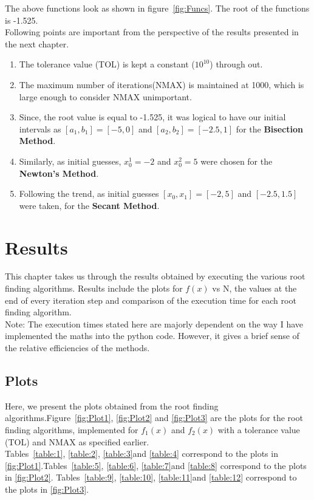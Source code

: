 \documentclass[a4paper, 12pt]{report}
\begin{document}
The above functions look as shown in figure~\ref{fig:Funcs}. The root of the functions is -1.525.\\
Following points are important from the perspective of the results presented in the next chapter.
\begin{enumerate}
    \item The tolerance value (TOL) is kept a constant ($10^{10}$) through out.
    \item The maximum number of iterations(NMAX) is maintained at 1000, which is large enough to consider NMAX unimportant.
    \item Since, the root value is equal to -1.525, it was logical to have our initial intervals as $[a_{1},b_{1}] = [-5,0]$ and $[a_{2},b_{2}] = [-2.5,1]$ for the \textbf{Bisection Method}.
    \item Similarly, as initial guesses, $x_{0}^{1} = -2$ and $x_{0}^{2} = 5$ were chosen for the \textbf{Newton's Method}.
    \item Following the trend, as initial guesses $[x_{0},x_{1}] = [-2,5]$ and $[-2.5,1.5]$ were taken, for the \textbf{Secant Method}.
\end{enumerate}
\chapter{Results}
This chapter takes us through the results obtained by executing the various root finding algorithms. Results include the plots for $f(x)$ vs N, the values at the end of every iteration step and comparison of the execution time for each root finding algorithm.\\
Note: The execution times stated here are majorly dependent on the way I have implemented the maths into the python code. However, it gives a brief sense of the relative efficiencies of the methods.
\section{Plots}
Here, we present the plots obtained from the root finding algorithms.Figure~\ref{fig:Plot1}, \ref{fig:Plot2} and \ref{fig:Plot3} are the plots for the root finding algorithms, implemented for $f_{1}(x)$ and $f_{2}(x)$ with a tolerance value (TOL) and NMAX as specified earlier.\\
Tables~\ref{table:1}, \ref{table:2}, \ref{table:3}and \ref{table:4} correspond to the plots in \ref{fig:Plot1}.Tables~\ref{table:5}, \ref{table:6}, \ref{table:7}and \ref{table:8} correspond to the plots in \ref{fig:Plot2}. Tables~\ref{table:9}, \ref{table:10}, \ref{table:11}and \ref{table:12} correspond to the plots in \ref{fig:Plot3}.
\end{document}
